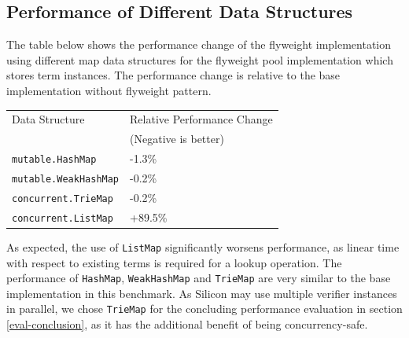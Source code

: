 \documentclass[11pt]{article}
\begin{document}
    \subsection{Performance of Different Data Structures} \label{eval-data-structures}
    

    The table below shows the performance change of the flyweight implementation
    using different map data structures for the flyweight pool implementation which stores
    term instances. The performance change is relative to the base implementation
    without flyweight pattern.

    \begin{center}
        \begin{tabular}{ ll } 
        \hline
        Data Structure & Relative Performance Change \\ 
        & (Negative is better) \\
        \hline
        \texttt{mutable.HashMap} & -1.3\% \\ 
        \texttt{mutable.WeakHashMap} & -0.2\% \\
        \texttt{concurrent.TrieMap} & -0.2\% \\
        \texttt{concurrent.ListMap} & +89.5\% \\ 
        \hline
        \end{tabular}
    \end{center}

    As expected, the use of \texttt{ListMap} significantly worsens performance,
    as linear time with respect to existing terms is required for a lookup operation.
    The performance of \texttt{HashMap}, \texttt{WeakHashMap} and \texttt{TrieMap}
    are very similar to the base implementation in this benchmark.
    As Silicon may use multiple verifier instances in parallel,
    we chose \texttt{TrieMap} for the concluding performance evaluation in section \ref{eval-conclusion}, as it has
    the additional benefit of being concurrency-safe.
\end{document}
